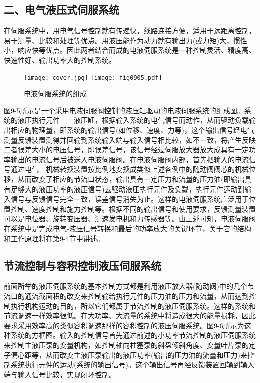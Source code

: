 \subsection{二、电气液压式伺服系统}

    在伺服系统中，用电气信号控制就有传递快，线路连接方便，适用于远距离控制，易于测量、比较和处理等优点。用液压能作为动力就有输出力(或力矩)大，惯性小，响应快等优点。因此两者结合而成的电液伺服系统是一种控制灵活、精度高、快速性好、输出功率大的控制系统。

\begin{figure}
\centering
\ifOpenSource
\texttt{[image: cover.jpg]}
\else
\texttt{[image: fig0905.pdf]}
\fi
\caption{电液伺服系统的组成}
\label{fig:fig0905}
\end{figure}

    图9-5所示是一个采用电液伺服阀控制的液压缸驱动的电液伺服系统的组成图。系统的液压执行元件——液压缸，根据输入系统的电气信号而动作，从而驱动负载输出相应的物理量，即系统的输出信号(如位移、速度、力等)，这个输出信号经电气测量反馈装置测得并回输到系统输入端与输入信号相比较，如不一致，将产生反映二者误差大小的电压信号，即误差信号，该信号经过伺服放大器放大成具有一定功率输出的电流信号后被送入电液伺服阀。在电液伺服阀内部，首先把输入的电流信号通过电气—机械转换装置按比例地变换成类似上述各例中的随动阀阀芯的机械位移，从而改变了相应的节流口状态，输出具有一定压力和流量的压力油(即输出具有足够大的液压功率的液压信号)去驱动液压执行元件及负载，执行元件运动到输入信号与反馈信号完全一致，误差信号消失为止。这样的电液伺服系统广泛用于位置控制、速度控制和施力控制等。根据不同的输出信号和使用要求，反馈测量装置可以是电位器、旋转变压器、测速发电机和力传感器等。由上述可知，电液伺服阀在系统中是完成电气-液压信号转换和最后的功率放大的关键环节，关于它的结构和工作原理将在第9-4节中讲述。

\subsection{节流控制与容积控制液压伺服系统}

    前面所举的液压伺服系统的基本控制方式都是利用液压放大器(随动阀)中的几个节流口的通流截面积的改变来控制输给执行元件的压力油的压力和流量，从而达到控制执行机构运动的目的，所以它们都属于节流控制的液压伺服系统。这样的系统和节流调速一样效率很低。在大功率、大流量的系统中将造成很大的能量损耗，因此要求采用效率高的类似容积调速那样的容积控制的液压伺服系统。图9-6所示为这种系统的方框图。输入的控制信号首先通过前述的小功率节流控制的液压伺服系统来控制主液压泵的变量机构，如控制轴向柱塞泵的斜盘倾斜角度、变量叶片泵的定子偏心距等，从而改变主液压泵输出的液压功率(输出的压力油的流量和压力)来控制系统执行元件的运动(系统的输出信号)。这个输出信号再经反馈装置回输到输入端与输入信号比较，实现闭环控制。

